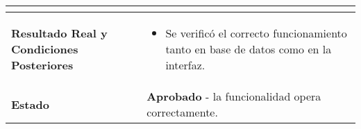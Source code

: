 \begin{longtable}{|p{5cm}|p{10cm}|}
\begin{itemize}
	\end{itemize} \\
	\hline
	\textbf{Resultado Real y Condiciones Posteriores} & 
	\begin{itemize}

		\item Se verificó el correcto funcionamiento tanto en base de datos como en la interfaz.
	\end{itemize} \\
	\hline
	\textbf{Estado} & 
	\textbf{Aprobado} - la funcionalidad opera correctamente. \\
	\hline
\end{longtable}
